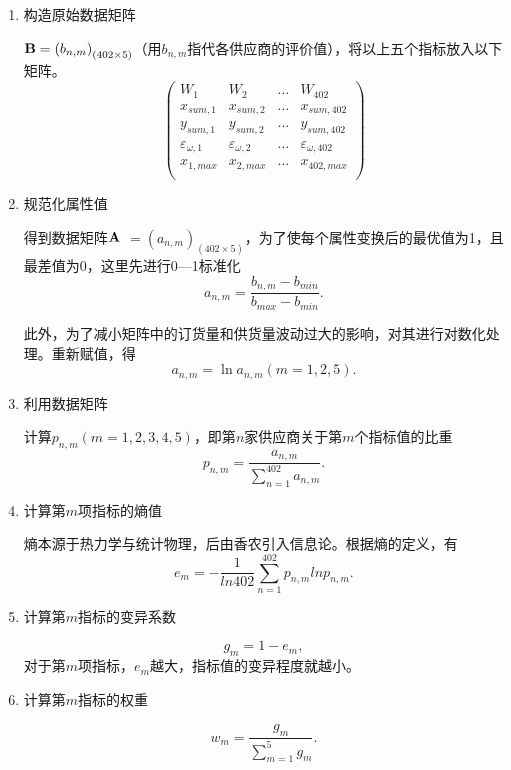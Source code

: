 \begin{enumerate}

\item 构造原始数据矩阵

${\text{\bf B}}={(b_{n,m})}_{(402 \times 5)}$（用$b_{n,m}$指代各供应商的评价值），将以上五个指标放入以下矩阵。
\begin{equation}       %
\left(                 %
  \begin{array}{cccc}
    W_1 & W_2 & \dots & W_{402}\\
    x_{sum,1} & x_{sum,2} & \dots & x_{sum,402}\\
    y_{sum,1} & y_{sum,2} & \dots & y_{sum,402}\\
    \varepsilon_{\omega,1} & \varepsilon_{\omega,2} & \dots & \varepsilon_{\omega,402} \\
    x_{1,max} & x_{2,max} & \dots & x_{402,max} \\
  \end{array}
\right)                 %
\end{equation}

\item 规范化属性值

得到数据矩阵$\bf A$ $ =(a_{n,m})_{(402 \times 5)}$，为了使每个属性变换后的最优值为1，且最差值为0，这里先进行0—1标准化
\begin{equation}
    a_{n,m}=\frac{b_{n,m}-b_{min}}{b_{max}-b_{min}}.
\end{equation}

此外，为了减小矩阵中的订货量和供货量波动过大的影响，对其进行对数化处理。重新赋值，得
\begin{equation}
    a_{n,m}=\ln a_{n,m} (m=1,2,5).
\end{equation}

\item 利用数据矩阵

计算$p_{n,m}(m=1,2,3,4,5)$，即第$n$家供应商关于第$m$个指标值的比重
\begin{equation}
    p_{n,m}=\frac{a_{n,m}}{\sum_{n=1}^{402}a_{n,m}}.
\end{equation}

\item 计算第$m$项指标的熵值

熵本源于热力学与统计物理，后由香农引入信息论。根据熵的定义，有
\begin{equation}
    e_m=-\frac{1}{ln402}\sum_{n=1}^{402}p_{n,m}lnp_{n,m}.
\end{equation}

\item 计算第$m$指标的变异系数

\begin{equation}
    g_m=1-e_m,
\end{equation}
对于第$m$项指标，$e_m$越大，指标值的变异程度就越小。

\item 计算第$m$指标的权重

\begin{equation}
    w_m=\frac{g_m}{\sum_{m=1}^{5}g_m}.
\end{equation}

\end{enumerate}

